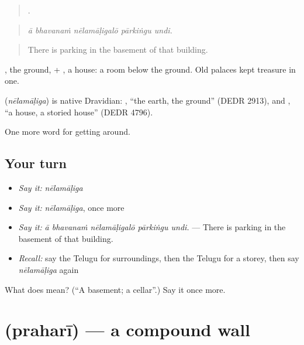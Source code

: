 \begin{quote}
    .
\end{quote}

\begin{quote}
\emph{ā bhavanaṁ nēlamāḷigalō pārkiṅgu undi.}
\end{quote}

\begin{quote}
There is parking in the basement of that building.
\end{quote}

, the ground, + , a house: a room below the ground. Old palaces kept treasure in one.

\begin{cousinweb}
\textbf{} (\emph{nēlamāḷiga}) is native Dravidian: , \textquotedblleft{}the earth, the ground\textquotedblright{} (DEDR 2913), and , \textquotedblleft{}a house, a storied house\textquotedblright{} (DEDR 4796).
\end{cousinweb}

\begin{grammarlens}[title={What you've built}]
One more word for getting around.
\end{grammarlens}

\subsection*{Your turn}
\begin{itemize}
\raggedright
  \item \emph{Say it:} \emph{nēlamāḷiga}
  \item \emph{Say it:} \emph{nēlamāḷiga}, once more
  \item \emph{Say it:} \emph{ā bhavanaṁ nēlamāḷigalō pārkiṅgu undi.} — There is parking in the basement of that building.
  \item \emph{Recall:} say the Telugu for surroundings, then the Telugu for a storey, then say \emph{nēlamāḷiga} again
\end{itemize}

\begin{tcolorbox}[breakable,colback=teal!4,colframe=teal!35!black,title={Before you move on}]
What does  mean? (\textquotedblleft{}A basement; a cellar\textquotedblright{}.) Say it once more.
\end{tcolorbox}
\section[\texorpdfstring{\te{ప్రహరీ} (praharī)}{ప్రహరీ (praharī)}]{ (praharī) — a compound wall}


